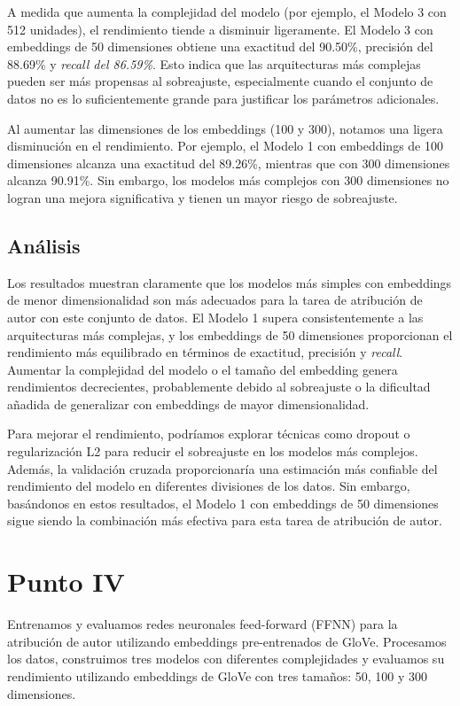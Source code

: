 \documentclass[11pt,english]{article}
\theoremstyle{plain}
\begin{document}
A medida que aumenta la complejidad del modelo (por ejemplo, el Modelo 3 con 512 unidades), el rendimiento tiende a disminuir ligeramente. El Modelo 3 con embeddings de 50 dimensiones obtiene una exactitud del 90.50\%, precisión del 88.69\% y \textit{recall del 86.59\%}. Esto indica que las arquitecturas más complejas pueden ser más propensas al sobreajuste, especialmente cuando el conjunto de datos no es lo suficientemente grande para justificar los parámetros adicionales.

Al aumentar las dimensiones de los embeddings (100 y 300), notamos una ligera disminución en el rendimiento. Por ejemplo, el Modelo 1 con embeddings de 100 dimensiones alcanza una exactitud del 89.26\%, mientras que con 300 dimensiones alcanza 90.91\%. Sin embargo, los modelos más complejos con 300 dimensiones no logran una mejora significativa y tienen un mayor riesgo de sobreajuste.

\subsection*{Análisis}

Los resultados muestran claramente que los modelos más simples con embeddings de menor dimensionalidad son más adecuados para la tarea de atribución de autor con este conjunto de datos. El Modelo 1 supera consistentemente a las arquitecturas más complejas, y los embeddings de 50 dimensiones proporcionan el rendimiento más equilibrado en términos de exactitud, precisión y \textit{recall}. Aumentar la complejidad del modelo o el tamaño del embedding genera rendimientos decrecientes, probablemente debido al sobreajuste o la dificultad añadida de generalizar con embeddings de mayor dimensionalidad.

Para mejorar el rendimiento, podríamos explorar técnicas como dropout o regularización L2 para reducir el sobreajuste en los modelos más complejos. Además, la validación cruzada proporcionaría una estimación más confiable del rendimiento del modelo en diferentes divisiones de los datos. Sin embargo, basándonos en estos resultados, el Modelo 1 con embeddings de 50 dimensiones sigue siendo la combinación más efectiva para esta tarea de atribución de autor.

\section*{Punto IV}

Entrenamos y evaluamos redes neuronales feed-forward (FFNN) para la atribución de autor utilizando embeddings pre-entrenados de GloVe. Procesamos los datos, construimos tres modelos con diferentes complejidades y evaluamos su rendimiento utilizando embeddings de GloVe con tres tamaños: 50, 100 y 300 dimensiones.
\end{document}
